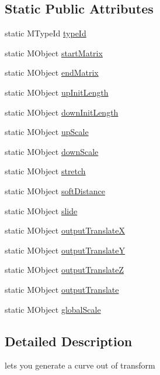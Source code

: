\subsection*{Static Public Attributes}
\begin{DoxyCompactItemize}
\item 
static M\-Type\-Id \hyperlink{class_m_g__soft_ik_aa83471e41222b306261d20f6851548b8}{type\-Id}
\item 
static M\-Object \hyperlink{class_m_g__soft_ik_aee30f7b1a9cd369af0797452171a1656}{start\-Matrix}
\item 
static M\-Object \hyperlink{class_m_g__soft_ik_ac909738ce18e4fb5997f468c0a33cdfb}{end\-Matrix}
\item 
static M\-Object \hyperlink{class_m_g__soft_ik_a77928e84cd0a9004779b0c180082efe9}{up\-Init\-Length}
\item 
static M\-Object \hyperlink{class_m_g__soft_ik_afb62d1fde24129ba913b96afc8ec4ecc}{down\-Init\-Length}
\item 
static M\-Object \hyperlink{class_m_g__soft_ik_a756bb616c77c3f8e43ede9b9e6cb5640}{up\-Scale}
\item 
static M\-Object \hyperlink{class_m_g__soft_ik_a52416d57abfb94a331943f1fa58fd53e}{down\-Scale}
\item 
static M\-Object \hyperlink{class_m_g__soft_ik_a72bd64a9986cbb29cec8953ef4199289}{stretch}
\item 
static M\-Object \hyperlink{class_m_g__soft_ik_a4ab55903fd1f7ac8b66438ad9ea07640}{soft\-Distance}
\item 
static M\-Object \hyperlink{class_m_g__soft_ik_aeb0fdd1e018c9a49d38f64856cf0ea6c}{slide}
\item 
static M\-Object \hyperlink{class_m_g__soft_ik_afe844848e40644cf73613d0592c67d16}{output\-Translate\-X}
\item 
static M\-Object \hyperlink{class_m_g__soft_ik_a8e1a854c6ed650a85eb0ee282a0ff986}{output\-Translate\-Y}
\item 
static M\-Object \hyperlink{class_m_g__soft_ik_a81840d1c2a32bb9583990881fa327359}{output\-Translate\-Z}
\item 
static M\-Object \hyperlink{class_m_g__soft_ik_a99464e8482fc066165a2eef1cef02027}{output\-Translate}
\item 
static M\-Object \hyperlink{class_m_g__soft_ik_a984339b87697837dd64877689846753d}{global\-Scale}
\end{DoxyCompactItemize}


\subsection{Detailed Description}
lets you generate a curve out of transform 

